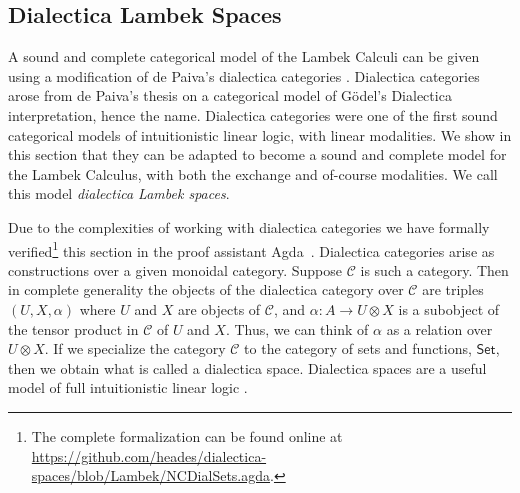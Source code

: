 \documentclass{llncs}
\let\mto\to                     %
\let\to\relax                   %
\newcommand{\to}{\rightarrow}
\newcommand{\cat}[1]{\mathcal{#1}}
\newcommand{\Set}{\mathsf{Set}}
\newcommand{\Lnt}[1]{\mathit{#1}}
\begin{document}



\subsection{Dialectica Lambek Spaces}
\label{sec:dialectica_lambek_spaces}

A sound and complete categorical model of  the Lambek Calculi
 can be given using a modification of de Paiva's
dialectica categories \cite{depaiva1990}.  Dialectica
categories arose from de Paiva's thesis on a categorical model
of G\"odel's Dialectica interpretation, hence the name.  Dialectica
categories were one of the first sound categorical models of
intuitionistic linear logic, with  linear modalities.  We show in
this section that they can be adapted to become a sound and complete model for the Lambek Calculus, with both the
exchange and of-course modalities. We call this model  \textit{dialectica Lambek spaces}.

Due to the complexities of working
with dialectica categories we have formally verified\footnote{The complete formalization can be
  found online at
  \url{https://github.com/heades/dialectica-spaces/blob/Lambek/NCDialSets.agda}.} this section in
the proof assistant Agda~\cite{bove2009}.
Dialectica categories arise as constructions over a given monoidal
category.  Suppose $\cat{C}$ is such a category.  Then in complete
generality the objects of the dialectica category over $\cat{C}$ are
triples $(U, X, \alpha)$ where $U$ and $X$ are objects of $\cat{C}$,
and $\alpha : A \mto U \otimes X$ is a subobject of the tensor product
in $\cat{C}$ of $U$ and $X$.  Thus, we can think of $\alpha$ as a
relation over $U \otimes X$.  If we specialize the category $\cat{C}$
to the category of sets and functions, $\Set$, then we obtain what is
called a dialectica space. Dialectica spaces are a useful model of
full intuitionistic linear logic \cite{Hyland:1993}.
\end{document}
